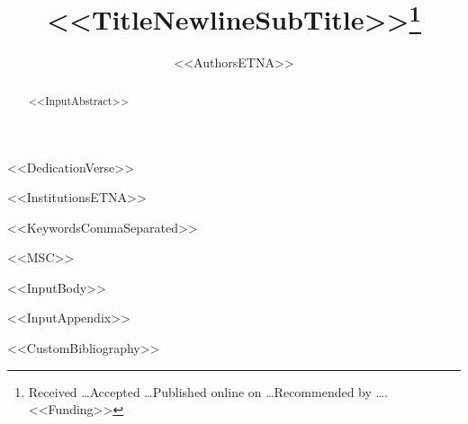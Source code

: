 \documentclass[%
leqno,
letterpaper,
<<DocumentClassOptions>>]{etna-scoop}
\title{<<TitleNewlineSubTitle>>\thanks{Received \ldots Accepted \ldots Published online on \ldots Recommended by \ldots. <<Funding>>}}
\author{<<AuthorsETNA>>}
\begin{document}
\maketitle

<<DedicationVerse>>

\renewcommand{\thefootnote}{\fnsymbol{footnote}}
<<InstitutionsETNA>>

\begin{abstract} 
<<InputAbstract>>
\end{abstract}

\begin{keywords}
<<KeywordsCommaSeparated>>
\end{keywords}

\begin{AMS}
<<MSC>>
\end{AMS}

<<InputBody>>

\appendix
<<InputAppendix>>


<<CustomBibliography>>
\end{document}
